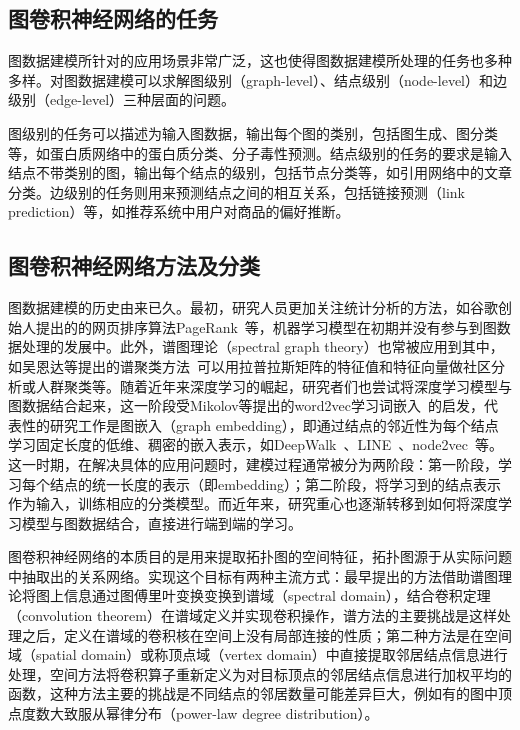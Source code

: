 \documentclass[final]{cvpr}
\begin{document}
\subsection{图卷积神经网络的任务}

图数据建模所针对的应用场景非常广泛，这也使得图数据建模所处理的任务也多种多样。对图数据建模可以求解图级别（graph-level）、结点级别（node-level）和边级别（edge-level）三种层面的问题。

图级别的任务可以描述为输入图数据，输出每个图的类别，包括图生成、图分类等，如蛋白质网络中的蛋白质分类、分子毒性预测。结点级别的任务的要求是输入结点不带类别的图，输出每个结点的级别，包括节点分类等，如引用网络中的文章分类。边级别的任务则用来预测结点之间的相互关系，包括链接预测（link prediction）等，如推荐系统中用户对商品的偏好推断。


\subsection{图卷积神经网络方法及分类}

图数据建模的历史由来已久。最初，研究人员更加关注统计分析的方法，如谷歌创始人提出的的网页排序算法PageRank~\cite{page1999pagerank}等，机器学习模型在初期并没有参与到图数据处理的发展中。此外，谱图理论（spectral graph theory）也常被应用到其中，如吴恩达等提出的谱聚类方法~\cite{ng2002spectral}可以用拉普拉斯矩阵的特征值和特征向量做社区分析或人群聚类等。随着近年来深度学习的崛起，研究者们也尝试将深度学习模型与图数据结合起来，这一阶段受Mikolov等提出的word2vec学习词嵌入~\cite{mikolov2013efficient}的启发，代表性的研究工作是图嵌入（graph embedding），即通过结点的邻近性为每个结点学习固定长度的低维、稠密的嵌入表示，如DeepWalk~\cite{perozzi2014deepwalk}、LINE~\cite{tang2015line}、node2vec~\cite{grover2016node2vec}等。这一时期，在解决具体的应用问题时，建模过程通常被分为两阶段：第一阶段，学习每个结点的统一长度的表示（即embedding）；第二阶段，将学习到的结点表示作为输入，训练相应的分类模型。而近年来，研究重心也逐渐转移到如何将深度学习模型与图数据结合，直接进行端到端的学习。

图卷积神经网络的本质目的是用来提取拓扑图的空间特征，拓扑图源于从实际问题中抽取出的关系网络。实现这个目标有两种主流方式：最早提出的方法借助谱图理论将图上信息通过图傅里叶变换变换到谱域（spectral domain），结合卷积定理（convolution theorem）在谱域定义并实现卷积操作，谱方法的主要挑战是这样处理之后，定义在谱域的卷积核在空间上没有局部连接的性质；第二种方法是在空间域（spatial domain）或称顶点域（vertex domain）中直接提取邻居结点信息进行处理，空间方法将卷积算子重新定义为对目标顶点的邻居结点信息进行加权平均的函数，这种方法主要的挑战是不同结点的邻居数量可能差异巨大，例如有的图中顶点度数大致服从幂律分布（power-law degree distribution）。
\end{document}
